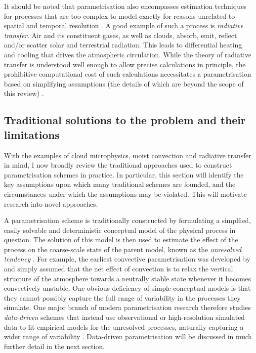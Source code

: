 \documentclass[titlepage,twoside]{article}
\numberwithin{equation}{section}
\begin{document}
It should be noted that parametrisation also encompasses estimation techniques
for processes that are too complex to model exactly for reasons unrelated to
spatial and temporal resolution \parencite{mcfarlane2011}. A good example of
such a process is \emph{radiative transfer}. Air and its constituent gases, as
well as clouds, absorb, emit, reflect and/or scatter solar and terrestrial
radiation. This leads to differential heating and cooling that drives the
atmospheric circulation. While the theory of radiative transfer is understood
well enough to allow precise calculations in principle, the prohibitive
computational cost of such calculations necessitates a parametrisation based on
simplifying assumptions (the details of which are beyond the scope of this
review) \parencite{christensen2022}.


\subsection{Traditional solutions to the problem and their limitations}%
\label{sec:traditional}
With the examples of cloud microphysics, moist convection and radiative
transfer in mind, I now broadly review the traditional approaches used to
construct parametrisation schemes in practice. In particular, this section will
identify the key assumptions upon which many traditional schemes are founded,
and the circumstances under which the assumptions may be violated. This will
motivate research into novel approaches.

A parametrisation scheme is traditionally constructed by formulating a
simplfied, easily solvable and deterministic conceptual model of the physical
process in question. The solution of this model is then used to estimate the
effect of the process on the coarse-scale state of the parent model, known as
the \emph{unresolved tendency} \parencite{mcfarlane2011}. For example, the earliest convective
parametrisation was developed by \textcite{manabe1965} and simply assumed that
the net effect of convection is to relax the vertical structure of the
atmosphere towards a neutrally stable state whenever it becomes convectively
unstable.
One obvious deficiency of simple conceptual models is that they cannot possibly
capture the full range of variability in the processes they simulate. One major
branch of modern parametrisation research therefore studies \emph{data-driven}
schemes that instead use observational or high-resolution simulated data to fit
empirical models for the unresolved processes, naturally capturing a wider
range of variability \parencite{christensen2022}. Data-driven parametrisation
will be discussed in much further detail in the next section.
\end{document}
